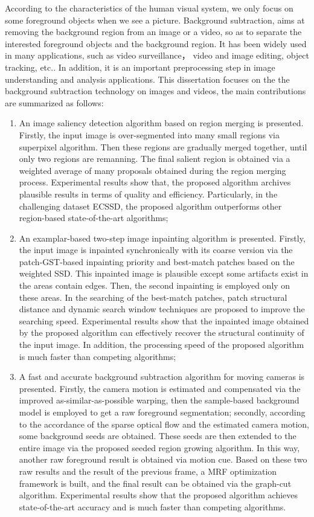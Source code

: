 \begin{eabstract}
   According to the characteristics of the human visual system, we only focus on some foreground objects when we see a picture. Background subtraction, aims at removing the background region from an image or a video, so as to separate the interested foreground objects and the background region. It has been widely used in many applications, such as video surveillance， video and image editing, object tracking, etc.. In addition, it is an important preprocessing step in image  understanding and analysis applications. This dissertation focuses on the the background subtraction technology on images and videos, the main contributions are summarized as follows:
   \begin{enumerate}
   \item An image saliency detection algorithm based on region merging is presented. Firstly, the input image is over-segmented into many small regions via superpixel algorithm. Then these regions are gradually merged together, until only two regions are remanning. The final salient region is obtained via a weighted average of many proposals obtained during the region merging process. Experimental results show that, the proposed algorithm archives plausible results in terms of quality and efficiency. Particularly, in the challenging dataset ECSSD, the proposed algorithm outperforms other region-based state-of-the-art algorithms;
   \item An examplar-based two-step image inpainting algorithm is presented. Firstly, the input image is inpainted synchronically with its coarse version via the patch-GST-based inpainting priority and best-match patches based on the weighted SSD. This inpainted image is plausible except some artifacts exist in the areas contain edges. Then, the second inpainting is employed only on these areas. In the searching of the best-match patches, patch structural distance and dynamic search window techniques are proposed to improve the searching speed. Experimental results show that the inpainted image obtained by the proposed algorithm can effectively recover the structural continuity of the input image. In addition, the processing speed of the proposed algorithm is much faster than competing algorithms;
   \item A fast and accurate background subtraction algorithm for moving cameras is presented. Firstly, the camera motion is estimated and compensated via the improved as-similar-as-possible warping, then the sample-based background model is employed to get a raw foreground segmentation; secondly, according to the accordance of the sparse optical flow and the estimated camera motion, some background seeds are obtained. These seeds are then extended to the entire image via the proposed seeded region growing algorithm. In this way, another raw foreground result is obtained via motion cue. Based on these two raw results and the result of the previous frame, a MRF optimization framework is built, and the final result can be obtained via the graph-cut algorithm. Experimental results show that the proposed algorithm achieves state-of-the-art accuracy and is much faster than competing algorithms.


\end{enumerate}
\end{eabstract}
